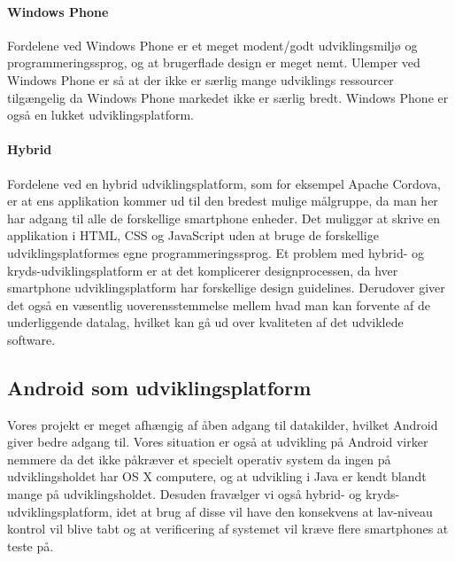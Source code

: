 \paragraph{Windows Phone}
Fordelene ved Windows Phone er et meget modent/godt udviklingsmiljø og programmeringssprog, og at brugerflade design er meget nemt. 
Ulemper ved Windows Phone er så at der ikke er særlig mange udviklings ressourcer tilgængelig da Windows Phone markedet ikke er særlig bredt.
Windows Phone er også en lukket udviklingsplatform.

\paragraph{Hybrid}
Fordelene ved en hybrid udviklingsplatform, som for eksempel Apache Cordova, er at ens applikation kommer ud til den bredest mulige målgruppe, da man her har adgang til alle de forskellige smartphone enheder.
Det muliggør at skrive en applikation i HTML, CSS og JavaScript uden at bruge de forskellige udviklingsplatformes egne programmeringssprog.
Et problem med hybrid- og kryds-udviklingsplatform er at det komplicerer designprocessen, da hver smartphone udviklingsplatform har forskellige design guidelines.
Derudover giver det også en væsentlig uoverensstemmelse mellem hvad man kan forvente af de underliggende datalag, hvilket kan gå ud over kvaliteten af det udviklede software.

\subsection{Android som udviklingsplatform}
Vores projekt er meget afhængig af åben adgang til datakilder, hvilket Android giver bedre adgang til.
Vores situation er også at udvikling på Android virker nemmere da det ikke påkræver et specielt operativ system da ingen på udviklingsholdet har OS X computere, og at udvikling i Java er kendt blandt mange på udviklingsholdet.
Desuden fravælger vi også hybrid- og kryds-udviklingsplatform, idet at brug af disse vil have den konsekvens at lav-niveau kontrol vil blive tabt og at verificering af systemet vil kræve flere smartphones at teste på.
